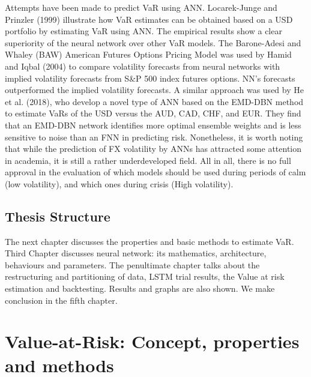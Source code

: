 \documentclass[a4paper,11pt,oneside]{book}
\begin{document}
\newline\newline
Attempts have been made to predict VaR using ANN. Locarek-Junge and Prinzler (1999) illustrate how VaR estimates can be obtained based on a USD portfolio by estimating VaR using ANN. The empirical results show a clear superiority of the neural network over other VaR models. The Barone-Adesi and Whaley (BAW) American Futures Options Pricing Model was used by Hamid and Iqbal (2004) to compare volatility forecasts from neural networks with implied volatility forecasts from S\&P 500 index futures options. NN's forecasts outperformed the implied volatility forecasts. A similar approach was used by He et al. (2018), who develop a novel type of ANN based on the EMD-DBN method to estimate VaRs of the USD versus the AUD, CAD, CHF, and EUR. They find that an EMD-DBN network identifies more optimal ensemble weights and is less sensitive to noise than an FNN in predicting risk. Nonetheless, it is worth noting that while the prediction of FX volatility by ANNs has attracted some attention in academia, it is still a rather underdeveloped field.
\newline\newline
All in all, there is no full approval in the evaluation of which models should be used during
periods of calm (low volatility), and which ones during crisis (High volatility).


\section{Thesis Structure}
The next chapter discusses the properties and basic methods to estimate VaR. Third Chapter discusses neural network: its mathematics, architecture, behaviours and parameters. The penultimate chapter talks about the restructuring and partitioning of data, LSTM trial results, the Value at risk estimation and backtesting. Results and graphs are also shown. We make conclusion in the fifth chapter.




\chapter{Value-at-Risk: Concept,  properties and methods}
\end{document}
